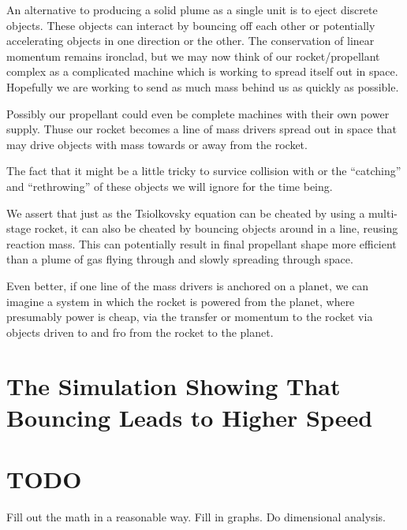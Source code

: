 \documentclass[11pt]{article}
\begin{document}
An alternative to producing a solid plume as a single unit is to eject discrete objects.
These objects can interact by bouncing off each other or potentially accelerating objects
in one direction or the other.  The conservation of linear momentum remains ironclad,
but we may now think of our rocket/propellant complex as a complicated machine which
is working to spread itself out in space. Hopefully we are working to send as much
mass behind us as quickly as possible.

Possibly our propellant could even be complete machines with their own power supply.
Thuse our rocket becomes a line of mass drivers spread out in space that may drive
objects with mass towards or away from the rocket.

The fact that it might be a little tricky to survice collision with or the ``catching'' and
``rethrowing'' of these objects we will ignore for the time being.

We assert that just as the Tsiolkovsky equation can be cheated by using a multi-stage
rocket, it can also be cheated by bouncing objects around in a line, reusing reaction mass.
This can potentially result in final propellant shape more efficient than a plume of
gas flying through and slowly spreading through space.

Even better, if one line of the mass drivers is anchored on a planet, we can
imagine a system in which the rocket is powered from the planet, where presumably power
is cheap, via the transfer or momentum to the rocket via objects driven to and fro from
the rocket to the planet.

\section{The Simulation Showing That Bouncing Leads to Higher Speed}



\section{TODO}

Fill out the math in a reasonable way.  Fill in graphs. Do dimensional analysis.
\end{document}
